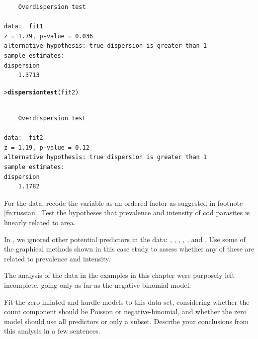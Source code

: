 \documentclass[10pt]{report}\usepackage[]{graphicx}\usepackage[]{color}
\makeatletter
\newcommand{\hlstd}[1]{\textcolor[rgb]{0.345,0.345,0.345}{#1}}%
\newcommand{\hlkwd}[1]{\textcolor[rgb]{0.737,0.353,0.396}{\textbf{#1}}}%
\newenvironment{kframe}{%
 \def\at@end@of@kframe{}%
 \ifinner\ifhmode%
  \def\at@end@of@kframe{\end{minipage}}%
  \begin{minipage}{\columnwidth}%
 \fi\fi%
 \def\FrameCommand##1{\hskip\@totalleftmargin \hskip-\fboxsep
 \colorbox{shadecolor}{##1}\hskip-\fboxsep
     \hskip-\linewidth \hskip-\@totalleftmargin \hskip\columnwidth}%
 \MakeFramed {\advance\hsize-\width
   \@totalleftmargin\z@ \linewidth\hsize
   \@setminipage}}%
 {\par\unskip\endMakeFramed%
 \at@end@of@kframe}
\newenvironment{knitrout}{}{} %
\renewenvironment{knitrout}{\small\renewcommand{\baselinestretch}{.85}}{} %
\makeatother
\begin{document}
\begin{Exercises}
\begin{enumerate*}
\begin{ans}
\begin{knitrout}
\begin{kframe}
\begin{verbatim}
	Overdispersion test

data:  fit1
z = 1.79, p-value = 0.036
alternative hypothesis: true dispersion is greater than 1
sample estimates:
dispersion 
    1.3713 
\end{verbatim}
\begin{alltt}
\hlstd{> }\hlkwd{dispersiontest}\hlstd{(fit2)}
\end{alltt}
\begin{verbatim}

	Overdispersion test

data:  fit2
z = 1.19, p-value = 0.12
alternative hypothesis: true dispersion is greater than 1
sample estimates:
dispersion 
    1.1782 
\end{verbatim}
\end{kframe}
\end{knitrout}

    \end{ans}
    
	\end{enumerate*}		

  \exercise For the  data, recode the  variable as an ordered factor as suggested in
  footnote \ref{fn:russian}.  Test the hypotheses that prevalence and intensity of cod parasites is linearly
  related to area.
  \begin{ans}
  \end{ans}
  

  \exercise In , we ignored other potential predictors in the  data:
  , , , , , and .
  Use some of the graphical methods shown in this case study to assess whether any of these are related
  to prevalence and intensity.
  \begin{ans}
  \end{ans}
  

  \exercise The analysis of the  data in the examples in this chapter were purposely left incomplete,
  going only as far as the negative binomial model.
  \begin{enumerate*}
    \item Fit the zero-inflated and hurdle models to this data set, considering whether the count component should
    be Poisson or negative-binomial, and whether the zero model should use all predictors or only a subset.
    Describe your conclusions from this analysis in a few sentences.
    \begin{ans}
    \end{ans}
    

\end{enumerate*}
\end{Exercises}
\end{document}
